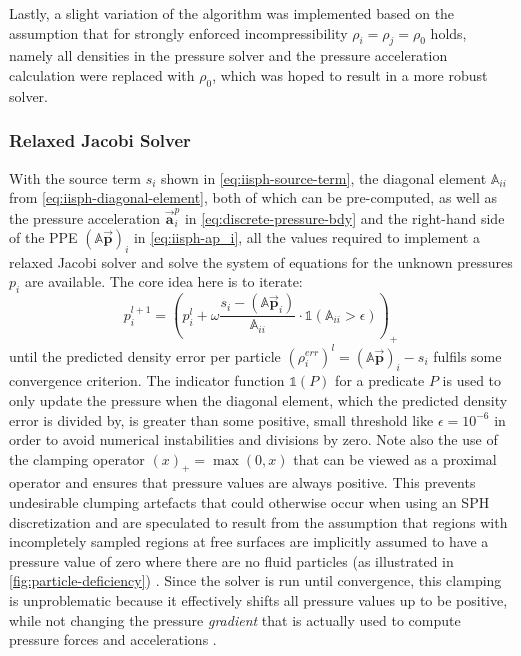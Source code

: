 \documentclass[oneside, a4paper]{book}
\newcommand\vek[1]{\vec{\bm{#1}}}
\newcommand\br[1]{\left(#1\right)}
\begin{document}
    Lastly, a slight variation of the algorithm was implemented based on the assumption that for strongly enforced incompressibility $\rho_i=\rho_j=\rho_0$ holds, namely all densities in the pressure solver and the pressure acceleration calculation were replaced with $\rho_0$, which was hoped to result in a more robust solver. 

    \subsubsection{Relaxed Jacobi Solver}\label{subsec:jacobi-solver}
    With the source term $s_i$ shown in \autoref{eq:iisph-source-term}, the diagonal element $\mathds{A}_{ii}$ from \autoref{eq:iisph-diagonal-element}, both of which can be pre-computed, as well as the pressure acceleration $\vek{a}_i^p$ in \autoref{eq:discrete-pressure-bdy} and the right-hand side of the PPE $\br{\mathds{A}\vek{p}}_i$ in \autoref{eq:iisph-ap_i}, all the values required to implement a relaxed Jacobi solver and solve the system of equations for the unknown pressures $p_i$ are available. The core idea here is to iterate:
    \begin{equation}
      p_i^{l+1} = \br{p_i^{l} + \omega \frac{s_i-\br{\mathds{A}\vek{p}_i}}{\mathds{A}_{ii}}\cdot\mathds{1}\br{\mathds{A}_{ii}>\epsilon}}_+\label{eq:iisph-relaxed-jacobi-iteration}
    \end{equation}
    until the predicted density error per particle $\br{\rho^{err}_i}^l = \br{\mathds{A}\vek{p}}_i-s_i$ fulfils some convergence criterion. The indicator function $\mathds{1}\br{P}$ for a predicate $P$ is used to only update the pressure when the diagonal element, which the predicted density error is divided by, is greater than some positive, small threshold like $\epsilon=10^{-6}$ in order to avoid numerical instabilities and divisions by zero. Note also the use of the clamping operator $\br{x}_+ = \max\br{0, x}$ that can be viewed as a proximal operator \autocite{monolithic-rigids-timo} and ensures that pressure values are always positive. This prevents undesirable clumping artefacts that could otherwise occur when using an SPH discretization \autocite{iisph} and are speculated to result from the assumption that regions with incompletely sampled regions at free surfaces are implicitly assumed to have a pressure value of zero where there are no fluid particles (as illustrated in \autoref{fig:particle-deficiency}) \autocite{tutorial2019}. Since the solver is run until convergence, this clamping is unproblematic because it effectively shifts all pressure values up to be positive, while not changing the pressure \textit{gradient} that is actually used to compute pressure forces and accelerations \autocite{tutorial2019}.
\end{document}
